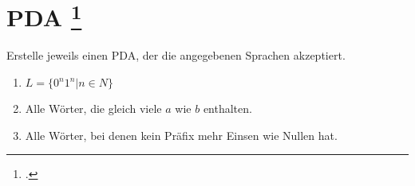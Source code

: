 \documentclass{lehramt-informatik-aufgabe}
\begin{document}
\section{PDA
\footcite{theo:ab:2}}

Erstelle jeweils einen PDA, der die angegebenen Sprachen akzeptiert.

\begin{enumerate}


\item $L = \{0^n 1^n | n \in N\}$


\item Alle Wörter, die gleich viele $a$ wie $b$ enthalten.


\item Alle Wörter, bei denen kein Präfix mehr Einsen wie Nullen hat.
\end{enumerate}
\end{document}
